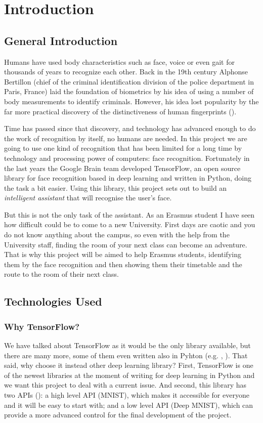 \chapter{Introduction}
\label{introduction}


\section{General Introduction}
Humans have used body characteristics such as face, voice or even gait for thousands of years to recognize each other. Back in the 19th century Alphonse Bertillon (chief of the criminal identification division of the police department in Paris, France) laid the foundation of biometrics by his idea of using a number of body measurements to identify criminals. However, his idea lost popularity by the far more practical discovery of the distinctiveness of human fingerprints (\cite{jain_biometrics}).

Time has passed since that discovery, and technology has advanced enough to do the work of recognition by itself, no humans are needed. In this project we are going to use one kind of recognition that has been limited for a long time by technology and processing power of computers: face recognition. Fortunately in the last years the Google Brain team developed TensorFlow, an open source library for face recognition based in deep learning and written in Python, doing the task a bit easier. Using this library, this project sets out to build an \textit{intelligent assistant} that will recognise the user's face.

But this is not the only task of the assistant. As an Erasmus student I have seen how difficult could be to come to a new University. First days are caotic and you do not know anything about the campus, so even with the help from the University staff, finding the room of your next class can become an adventure. That is why this project will be aimed to help Erasmus students, identifying them by the face recognition and then showing them their timetable and the route to the room of their next class.

\section{Technologies Used}	

	\subsection{Why TensorFlow?}
	We have talked about TensorFlow as it would be the only library available, but there are many more, some of them even written also in Pyhton (e.g. \cite{theano_main_site}, \cite{caffe_main_site}). That said, why choose it instead other deep learning library? First, TensorFlow is one of the newest libraries at the moment of writing for deep learning in Python and we want this project to deal with a current issue. And second, this library has two APIs (\cite{tensorflow_main_website}): a high level API (MNIST), which makes it accessible for everyone and it will be easy to start with; and a low level API (Deep MNIST), which can provide a more advanced control for the final development of the project.

